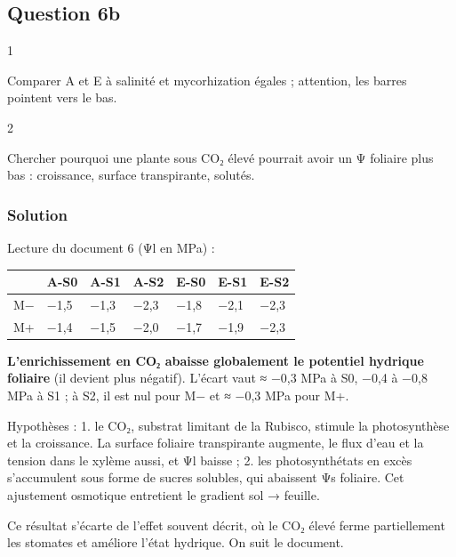 \documentclass[11pt,a4paper]{article}
\begin{document}
\hypertarget{question-6b}{%
\subsection{Question 6b}\label{question-6b}}

\begin{indication}{1}

Comparer A et E à salinité et mycorhization égales ; attention, les barres pointent vers le bas.

\end{indication}

\begin{indication}{2}

Chercher pourquoi une plante sous CO₂ élevé pourrait avoir un Ψ foliaire plus bas : croissance, surface transpirante, solutés.

\end{indication}

\hypertarget{solution-12}{%
\subsubsection{Solution}\label{solution-12}}

Lecture du document 6 (Ψl en MPa) :

\begin{longtable}[]{@{}lllllll@{}}
\toprule\noalign{}
& A-S0 & A-S1 & A-S2 & E-S0 & E-S1 & E-S2 \\
\midrule\noalign{}
\endhead
\bottomrule\noalign{}
\endlastfoot
M− & −1,5 & −1,3 & −2,3 & −1,8 & −2,1 & −2,3 \\
M+ & −1,4 & −1,5 & −2,0 & −1,7 & −1,9 & −2,3 \\
\end{longtable}

\textbf{L'enrichissement en CO₂ abaisse globalement le potentiel hydrique foliaire} (il devient plus négatif). L'écart vaut ≈ −0,3 MPa à S0, −0,4 à −0,8 MPa à S1 ; à S2, il est nul pour M− et ≈ −0,3 MPa pour M+.

Hypothèses :
1. le CO₂, substrat limitant de la Rubisco, stimule la photosynthèse et la croissance. La surface foliaire transpirante augmente, le flux d'eau et la tension dans le xylème aussi, et Ψl baisse ;
2. les photosynthétats en excès s'accumulent sous forme de sucres solubles, qui abaissent Ψs foliaire. Cet ajustement osmotique entretient le gradient sol → feuille.

Ce résultat s'écarte de l'effet souvent décrit, où le CO₂ élevé ferme partiellement les stomates et améliore l'état hydrique. On suit le document.
\end{document}
